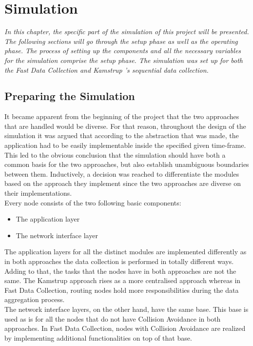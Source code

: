 \chapter{Simulation}
\label{sec:simulation_results}

\textit{In this chapter, the specific part of the simulation of this project will be presented. The following sections will go through the setup phase as well as the operating phase. The process of setting up the components and all the necessary variables for the simulation comprise the setup phase. The simulation was set up for both the Fast Data Collection and Kamstrup 's sequential data collection.}

\section{Preparing the Simulation}
It became apparent from the beginning of the project that the two approaches that are handled would be diverse. For that reason, throughout the design of the simulation it was argued that according to the abstraction that was made, the application had to be easily implementable inside the specified given time-frame. This led to the obvious conclusion that the simulation should have both a common basis for the two approaches, but also establish unambiguous boundaries between them. Inductively, a decision was reached to differentiate the modules based on the approach they implement since the two approaches are diverse on their implementations.\\
Every node consists of the two following basic components:

\begin{itemize}
\item The application layer
\item The network interface layer
\end{itemize}

The application layers for all the distinct modules are implemented differently as in both approaches the data collection is performed in totally different ways. Adding to that, the tasks that the nodes have in both approaches are not the same. The Kamstrup approach rises as a more centralised approach whereas in Fast Data Collection, routing nodes hold more responsibilities during the data aggregation process.\\
The network interface layers, on the other hand, have the same base. This base is used as is for all the nodes that do not have Collision Avoidance in both approaches. In Fast Data Collection, nodes with Collision Avoidance are realized by implementing additional functionalities on top of that base.

